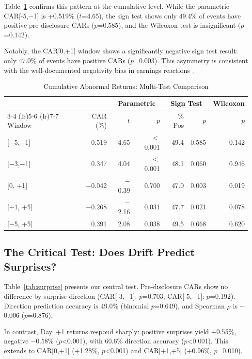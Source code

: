 \documentclass[manuscript,review]{acmart}
\begin{document}
Table~\ref{tab:car} confirms this pattern at the cumulative level. While the parametric CAR[-5,$-$1] is +0.519\% ($t$=4.65), the sign test shows only 49.4\% of events have positive pre-disclosure CARs ($p$=0.585), and the Wilcoxon test is insignificant ($p$=0.142).

Notably, the CAR[0,+1] window shows a significantly negative sign test result: only 47.0\% of events have positive CARs ($p$=0.003). This asymmetry is consistent with the well-documented negativity bias in earnings reactions \cite{skinner1994investment}.

\begin{table}[ht]
\caption{Cumulative Abnormal Returns: Multi-Test Comparison}
\label{tab:car}
\begin{tabular}{lrrrrrr}
\toprule
& & \multicolumn{2}{c}{Parametric} & \multicolumn{2}{c}{Sign Test} & {Wilcoxon} \\
\cmidrule(lr){3-4} \cmidrule(lr){5-6} \cmidrule(lr){7-7}
Window & CAR (\%) & $t$ & $p$ & \% Pos & $p$ & $p$ \\
\midrule
{[}$-$5,$-$1{]} & 0.519 & 4.65 & $<$0.001 & 49.4 & 0.585 & 0.142 \\
{[}$-$3,$-$1{]} & 0.347 & 4.04 & $<$0.001 & 48.1 & 0.060 & 0.946 \\
{[}0, +1{]} & $-$0.042 & $-$0.39 & 0.700 & 47.0 & 0.003 & 0.019 \\
{[}+1, +5{]} & $-$0.268 & $-$2.16 & 0.031 & 47.7 & 0.021 & 0.078 \\
{[}$-$5, +5{]} & 0.391 & 2.08 & 0.038 & 49.5 & 0.668 & 0.620 \\
\bottomrule
\end{tabular}
\end{table}

\subsection{The Critical Test: Does Drift Predict Surprises?}

Table~\ref{tab:surprise} presents our central test. Pre-disclosure CARs show no difference by surprise direction (CAR[-3,$-$1]: $p$=0.703; CAR[-5,$-$1]: $p$=0.192). Direction prediction accuracy is 49.0\% (binomial $p$=0.649), and Spearman $\rho$ is $-$0.006 ($p$=0.876).

In contrast, Day~+1 returns respond sharply: positive surprises yield +0.55\%, negative $-$0.58\% ($p$<0.001), with 60.6\% direction accuracy ($p$<0.001). This extends to CAR[0,+1] (+1.28\%, $p$<0.001) and CAR[+1,+5] (+0.96\%, $p$=0.010).
\end{document}
